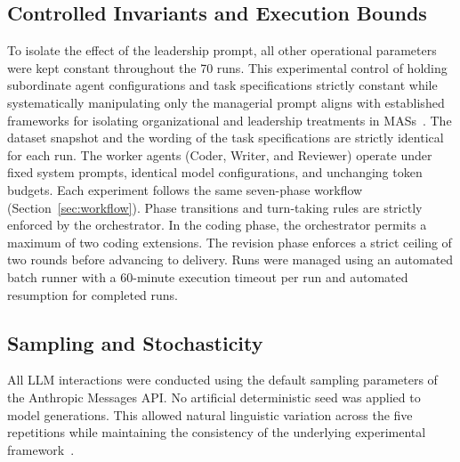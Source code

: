 \subsection{Controlled Invariants and Execution Bounds}
\label{subsec:controlled-invariants}

To isolate the effect of the leadership prompt, all other operational parameters were kept constant throughout the 70 runs.
This experimental control of holding subordinate agent configurations and task specifications strictly constant while systematically manipulating only the managerial prompt aligns with established frameworks for isolating organizational and leadership treatments in \acp{MAS}~\cite{kwak2026leadershipcoordinationcontrolbehavioral, muralidharan2025lessonshumanteamsapplied}.
The dataset snapshot and the wording of the task specifications are strictly identical for each run.
The worker agents (Coder, Writer, and Reviewer) operate under fixed system prompts, identical model configurations, and unchanging token budgets.
Each experiment follows the same seven-phase workflow (Section~\ref{sec:workflow}).
Phase transitions and turn-taking rules are strictly enforced by the orchestrator.
In the coding phase, the orchestrator permits a maximum of two coding extensions.
The revision phase enforces a strict ceiling of two rounds before advancing to delivery.
Runs were managed using an automated batch runner with a 60-minute execution timeout per run and automated resumption for completed runs.

\subsection{Sampling and Stochasticity}
\label{subsec:sampling-stochasticity}

All \ac{LLM} interactions were conducted using the default sampling parameters of the Anthropic Messages \ac{API}.
No artificial deterministic seed was applied to model generations.
This allowed natural linguistic variation across the five repetitions while maintaining the consistency of the underlying experimental framework~\cite{argyle2023outofonemanyllmstosimulatehumansamples, yehudai2026surveyevaluationllmbasedagents}.
